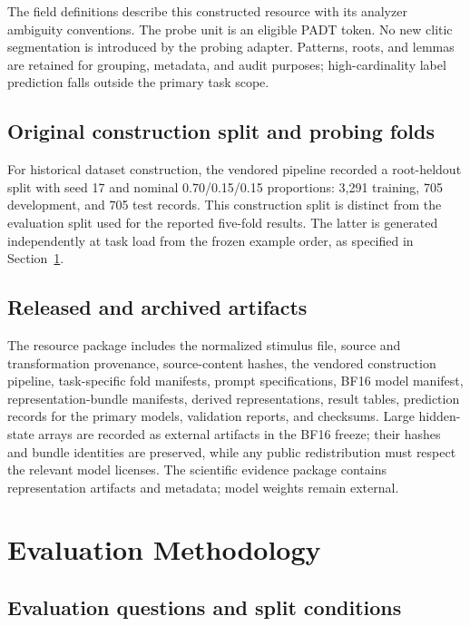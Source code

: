 \documentclass[pdflatex,sn-basic]{sn-jnl}
\begin{document}
The field definitions describe this constructed resource with its analyzer
ambiguity conventions. The probe unit is an eligible PADT token. No new clitic
segmentation is introduced by the probing adapter. Patterns, roots, and lemmas
are retained for grouping, metadata, and audit purposes; high-cardinality label
prediction falls outside the primary task scope.

\subsection{Original construction split and probing folds}

For historical dataset construction, the vendored pipeline recorded a
root-heldout split with seed 17 and nominal 0.70/0.15/0.15 proportions: 3,291
training, 705 development, and 705 test records. This construction split is
distinct from the evaluation split used for the reported five-fold results.
The latter is generated independently at task load from the frozen example order, as
specified in Section~\ref{sec:methodology}.

\subsection{Released and archived artifacts}

The resource package includes the normalized stimulus file, source and
transformation provenance, source-content hashes, the vendored construction
pipeline, task-specific fold manifests, prompt specifications, BF16 model
manifest, representation-bundle manifests, derived representations, result
tables, prediction records for the primary models, validation reports, and
checksums. Large hidden-state arrays are recorded as external artifacts in the
BF16 freeze; their hashes and bundle identities are preserved, while any public
redistribution must respect the relevant model licenses. The scientific
evidence package contains representation artifacts and metadata; model weights
remain external.

\section{Evaluation Methodology}\label{sec:methodology}

\subsection{Evaluation questions and split conditions}
\end{document}
